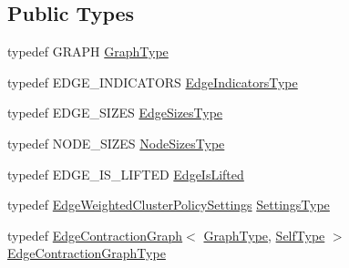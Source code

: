\subsection*{Public Types}
\begin{DoxyCompactItemize}
\item 
typedef G\+R\+A\+P\+H \hyperlink{classnifty_1_1graph_1_1agglo_1_1LiftedGraphEdgeWeightedClusterPolicy_ae3d069ea1fd066a37e1c816c0bf50b83}{Graph\+Type}
\item 
typedef E\+D\+G\+E\+\_\+\+I\+N\+D\+I\+C\+A\+T\+O\+R\+S \hyperlink{classnifty_1_1graph_1_1agglo_1_1LiftedGraphEdgeWeightedClusterPolicy_ad0813aa75f1e76d10b794cab88615f61}{Edge\+Indicators\+Type}
\item 
typedef E\+D\+G\+E\+\_\+\+S\+I\+Z\+E\+S \hyperlink{classnifty_1_1graph_1_1agglo_1_1LiftedGraphEdgeWeightedClusterPolicy_ad63cc4f759cd05f1bf9b7fec48629221}{Edge\+Sizes\+Type}
\item 
typedef N\+O\+D\+E\+\_\+\+S\+I\+Z\+E\+S \hyperlink{classnifty_1_1graph_1_1agglo_1_1LiftedGraphEdgeWeightedClusterPolicy_a83ef319d77186be2fc3957ed06f0a8f1}{Node\+Sizes\+Type}
\item 
typedef E\+D\+G\+E\+\_\+\+I\+S\+\_\+\+L\+I\+F\+T\+E\+D \hyperlink{classnifty_1_1graph_1_1agglo_1_1LiftedGraphEdgeWeightedClusterPolicy_ad104d8984e0964ccfb7d1ec06ee977a2}{Edge\+Is\+Lifted}
\item 
typedef \hyperlink{structnifty_1_1graph_1_1agglo_1_1EdgeWeightedClusterPolicySettings}{Edge\+Weighted\+Cluster\+Policy\+Settings} \hyperlink{classnifty_1_1graph_1_1agglo_1_1LiftedGraphEdgeWeightedClusterPolicy_a7bf0e26a2c4776e866807429e912084b}{Settings\+Type}
\item 
typedef \hyperlink{classnifty_1_1graph_1_1EdgeContractionGraph}{Edge\+Contraction\+Graph}$<$ \hyperlink{classnifty_1_1graph_1_1agglo_1_1LiftedGraphEdgeWeightedClusterPolicy_ae3d069ea1fd066a37e1c816c0bf50b83}{Graph\+Type}, \hyperlink{classnifty_1_1graph_1_1agglo_1_1LiftedGraphEdgeWeightedClusterPolicy}{Self\+Type} $>$ \hyperlink{classnifty_1_1graph_1_1agglo_1_1LiftedGraphEdgeWeightedClusterPolicy_a316c395d0d3bcc00ddbed21302419354}{Edge\+Contraction\+Graph\+Type}
\end{DoxyCompactItemize}

